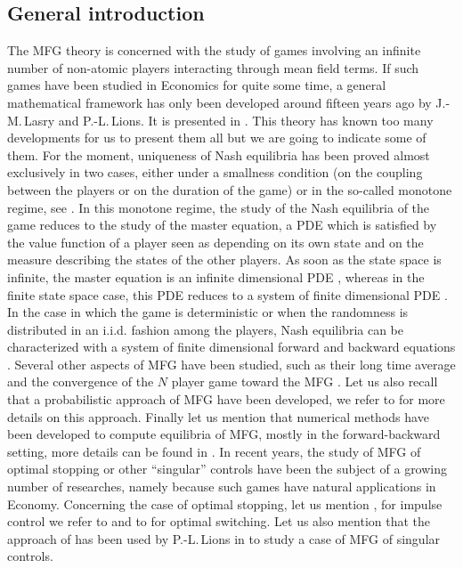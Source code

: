 \documentclass[JEP,XML,SOM,Unicode,NoEqCountersInSection,published]{cedram}
\theoremstyle{definition}
\begin{document}
\subsection*{General introduction}
The MFG theory is concerned with the study of games involving an infinite number of non-atomic players interacting through mean field terms. If such games have been studied in Economics for quite some time, a general mathematical framework has only been developed around fifteen years ago by J.\nobreakdash-M.\,Lasry and P.-L.\,Lions. It is presented in \cite{lasry2007mean,lions2007cours}. This theory has known too many developments for us to present them all but we are going to indicate some of them. For the moment, uniqueness of Nash equilibria has been proved almost exclusively in two cases, either under a smallness condition (on the coupling between the players or on the duration of the game) or in the so-called monotone regime, see \cite{lasry2007mean,lions2007cours,porretta2015weak}. In this monotone regime, the study of the Nash equilibria of the game reduces to the study of the master equation, a PDE which is satisfied by the value function of a player seen as depending on its own state and on the measure describing the states of the other players. As soon as the state space is infinite, the master equation is an infinite dimensional PDE \cite{cardaliaguet2019master}, whereas in the finite state space case, this PDE reduces to a system of finite dimensional PDE \cite{lions2007cours,bayraktarcohen,cecchinpelino}. In the case in which the game is deterministic or when the randomness is distributed in an i.i.d. fashion among the players, Nash equilibria can be characterized with a system of finite dimensional forward and backward equations \cite{lasry2007mean,cardaliaguet2019master}. Several other aspects of MFG have been studied, such as their long time average \cite{cardaliaguet2019long,cardaliaguet2012long} and the convergence of the $N$ player game toward the MFG \cite{cardaliaguet2019master,lacker2018convergence,cecchinpelino}. Let us also recall that a probabilistic approach of MFG have been developed, we refer to \cite{carmona2018probabilistic,lacker2016general} for more details on this approach. Finally let us mention that numerical methods have been developed to compute equilibria of MFG, mostly in the forward-backward setting, more details can be found in \cite{achdou2010mean,achdou2020mean,briceno2019implementation}.
In recent years, the study of MFG of optimal stopping or other ``singular'' controls have been the subject of a growing number of researches, namely because such games have natural applications in Economy. Concerning the case of optimal stopping, let us mention \cite{bertucci2018optimal, carmona2016mean,nutz2016mean,nutz2020convergence}, for impulse control we refer to \cite{bertucci2020fokker} and to \cite{gomes2016weakly} for optimal switching. Let us also mention that the approach of \cite{bertucci2018optimal,bertucci2020fokker} has been used by P.-L.\,Lions in \cite{lions2018cours} to study a case of MFG of singular controls.
\end{document}
